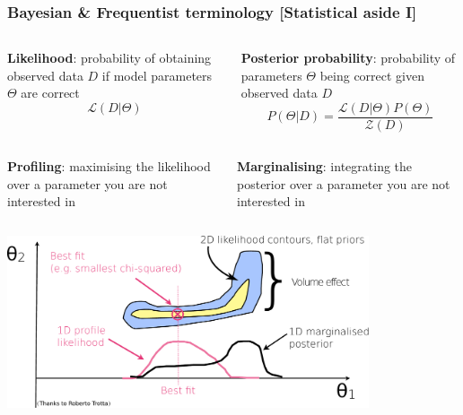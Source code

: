 \documentclass[xcolor=dvipsnames]{beamer}
\newcommand{\corange}[1]{{\color[rgb]{0.9, 0.5, 0.0} #1}}
\begin{document}
\begin{frame}
\frametitle{Bayesian \& Frequentist terminology [\alert{Statistical aside I}]}

\footnotesize

\begin{columns}[c]

\textbf{Likelihood}: probability of obtaining observed data $D$ if model parameters $\Theta$ are correct
\begin{equation}
  \mathcal{L}(D|\Theta)
\end{equation}

\textbf{Posterior probability}: probability of parameters $\Theta$ being correct given observed data $D$
\begin{equation}
  P(\Theta|D) = \frac{\mathcal{L}(D|\Theta) P(\Theta)}{\mathcal{Z}(D)}
\end{equation}

\end{columns}

\begin{columns}[c]

\textbf{Profiling}: \corange{maximising} the \corange{likelihood} over a parameter you are not interested in

\textbf{Marginalising}: \corange{integrating} the \corange{posterior} over a parameter you are not interested in

\end{columns}\vspace{3mm}

\centering\includegraphics[width=0.8\textwidth]{likepost}


\end{frame}
\end{document}
